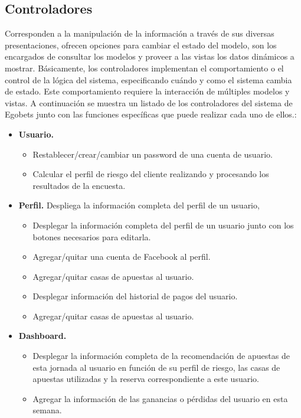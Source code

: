 		\subsection{Controladores}
		Corresponden a la manipulación de la información a través de sus diversas presentaciones, ofrecen opciones para cambiar el estado del modelo, son los encargados de consultar los modelos y proveer a las vistas los datos dinámicos a mostrar. Básicamente, los controladores implementan el comportamiento o el control de la lógica del sistema, especificando cuándo y como el sistema cambia de estado. Este comportamiento requiere la interacción de múltiples modelos y vistas.
		A continuación se muestra un listado de los controladores del sistema de Egobets junto con las funciones específicas que puede realizar cada uno de ellos.:
		\begin{itemize}
			\item \textbf{Usuario.} 
			\begin{itemize}
				\item Restablecer/crear/cambiar un password de una cuenta de usuario.
				\item Calcular el perfil de riesgo del cliente realizando y procesando los resultados de la encuesta.
			\end{itemize}
			\item \textbf{Perfil.} Despliega la información completa del perfil de un usuario, 
			\begin{itemize}
				\item Desplegar la información completa del perfil de un usuario junto con los botones necesarios para editarla.
				\item Agregar/quitar una cuenta de Facebook al perfil.
				\item Agregar/quitar casas de apuestas al usuario.
 				\item Desplegar información del historial de pagos del usuario.
				\item Agregar/quitar casas de apuestas al usuario.
			\end{itemize}
			\item \textbf{Dashboard.}
			\begin{itemize}
				\item Desplegar la información completa de la recomendación de apuestas de esta jornada al usuario en función de su perfil de riesgo, las casas de apuestas utilizadas y la reserva correspondiente a este usuario.
				\item Agregar la información de las ganancias o pérdidas del usuario en esta semana.

\end{itemize}
\end{itemize}
